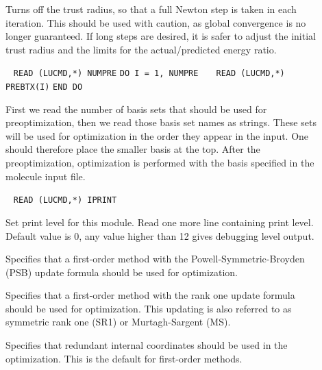 \begin{description}
\item[]
Turns off the trust radius, so that a full Newton step
is taken in each iteration. This should be used with caution, as
global convergence is no longer guaranteed. If long steps are desired,
it is safer to adjust the initial trust radius and the limits for the
actual/predicted energy ratio.

\item[]\verb| |\newline
\verb|READ (LUCMD,*) NUMPRE|\newline
\verb|DO I = 1, NUMPRE|\newline
\verb|   READ (LUCMD,*) PREBTX(I)|\newline
\verb|END DO|

First we read the number of basis sets that should be
used for preoptimization, then we read those
basis set names as strings. These
sets will be used for optimization in the order they appear in the
input. One should therefore place the smaller basis at the
top. After the preoptimization, optimization is performed with the
basis specified in the molecule input file.

\item[]\verb| |
\newline
\verb|READ (LUCMD,*) IPRINT|

Set print level for this module.  Read one more line containing print
level. Default value is 0, any value higher than 12 gives debugging
level output.

\item[]
Specifies that a first-order method with the
Powell-Symmetric-Broyden (PSB)
update formula should be used for optimization.


\item[]
Specifies that a first-order method with the rank one update
formula should be used for optimization. This updating is also
referred to as symmetric rank one (SR1) or Murtagh-Sargent (MS).

\item[]
Specifies that redundant internal coordinates
should be used in the optimization. This is the default for
first-order methods.


\end{description}
